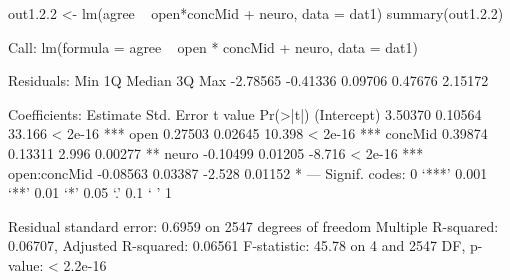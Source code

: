 \begin{Schunk}
\begin{Sinput}
 out1.2.2 <- lm(agree ~ open*concMid + neuro, data = dat1)
 summary(out1.2.2)
\end{Sinput}
\begin{Soutput}
Call:
lm(formula = agree ~ open * concMid + neuro, data = dat1)

Residuals:
     Min       1Q   Median       3Q      Max 
-2.78565 -0.41336  0.09706  0.47676  2.15172 

Coefficients:
             Estimate Std. Error t value Pr(>|t|)    
(Intercept)   3.50370    0.10564  33.166  < 2e-16 ***
open          0.27503    0.02645  10.398  < 2e-16 ***
concMid       0.39874    0.13311   2.996  0.00277 ** 
neuro        -0.10499    0.01205  -8.716  < 2e-16 ***
open:concMid -0.08563    0.03387  -2.528  0.01152 *  
---
Signif. codes:  0 ‘***’ 0.001 ‘**’ 0.01 ‘*’ 0.05 ‘.’ 0.1 ‘ ’ 1

Residual standard error: 0.6959 on 2547 degrees of freedom
Multiple R-squared:  0.06707,	Adjusted R-squared:  0.06561 
F-statistic: 45.78 on 4 and 2547 DF,  p-value: < 2.2e-16
\end{Soutput}
\end{Schunk}

